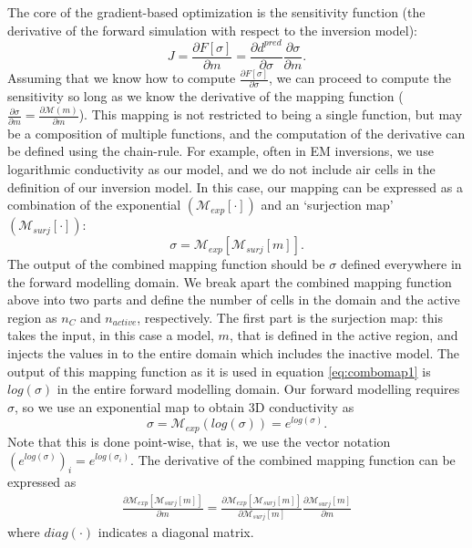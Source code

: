 \documentclass{segabs}
\begin{document}
The core of the gradient-based optimization is the sensitivity function (the derivative of the forward simulation with respect to the inversion model):
\begin{equation}
  J = \frac{\partial F[\sigma]}{\partial m} = \frac{\partial d^{pred}}{\partial \sigma}\frac{\partial \sigma}{\partial m}.
\end{equation}
Assuming that we know how to compute $\frac{\partial F[\sigma]}{\partial \sigma}$, we can proceed to compute the sensitivity so long as we know the derivative of the mapping function ($\frac{\partial \sigma}{\partial m} = \frac{\partial \mathcal{M}(m)}{\partial m}$).
This mapping is not restricted to being a single function, but may be a composition of multiple functions, and the computation of the derivative can be defined using the chain-rule. For example, often  in EM inversions, we use logarithmic conductivity as our model, and we do not include air cells in the definition of our inversion model. In this case, our mapping can be expressed as a combination of the exponential $(\mathcal{M}_{exp}[\cdot])$ and an `surjection map' $(\mathcal{M}_{surj}[\cdot])$:
\begin{equation}
  \sigma = \mathcal{M}_{exp}[\mathcal{M}_{surj}[m]].
  \label{eq:combomap1}
\end{equation}
The output of the combined mapping function should be $\sigma$ defined everywhere in the forward modelling domain. We break apart the combined mapping function above into two parts and define the number of cells in the domain and the active region as $n_{C}$ and $n_{active}$, respectively. The first part is the surjection map: this takes the input, in this case a model, $m$, that is defined in the active region, and injects the values in to the entire domain which includes the inactive model. The output of this mapping function as it is used in equation \ref{eq:combomap1} is $log(\sigma)$ in the entire forward modelling domain. Our forward modelling requires $\sigma$, so we use an exponential map to obtain 3D conductivity as
\begin{equation}
  \sigma = \mathcal{M}_{exp}(log(\sigma)) = e^{log(\sigma)}.
\end{equation}
Note that this is done point-wise, that is, we use the vector notation $(e^{log(\sigma)})_{i} = e^{log(\sigma_{i})}$.
The derivative of the combined mapping function can be expressed as
\begin{eqnarray}
  \frac{\partial \mathcal{M}_{exp}[\mathcal{M}_{surj}[m]]}{\partial m}  
  = \frac{\partial \mathcal{M}_{exp}[\mathcal{M}_{surj}[m]]}{\partial  \mathcal{M}_{surj}[m]}
  \frac{\partial \mathcal{M}_{surj}[m]}{\partial  m} \nonumber
\end{eqnarray}
where $diag(\cdot)$ indicates a diagonal matrix. 
\end{document}
